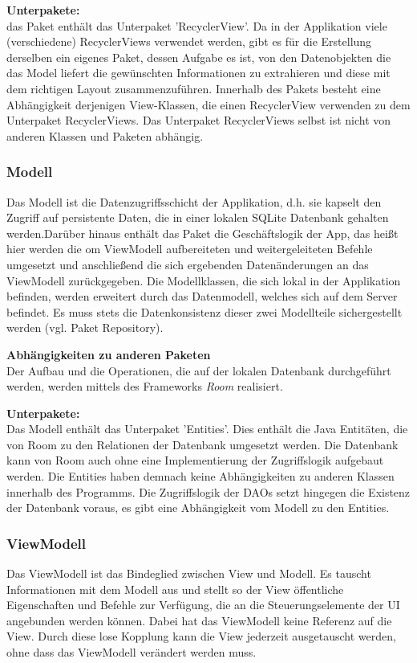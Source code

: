 \documentclass[11pt,a4paper]{article}
\begin{document}
\textbf{Unterpakete:}\\
das Paket enthält das Unterpaket 'RecyclerView'. Da in der Applikation viele (verschiedene) RecyclerViews verwendet werden, gibt es für die Erstellung derselben ein eigenes Paket, dessen Aufgabe es ist, von den Datenobjekten die das Model liefert die gewünschten Informationen zu extrahieren und diese mit dem richtigen Layout zusammenzuführen. Innerhalb des Pakets besteht eine Abhängigkeit derjenigen View-Klassen, die einen RecyclerView verwenden zu dem Unterpaket RecyclerViews. Das Unterpaket RecyclerViews selbst ist nicht von anderen Klassen und Paketen abhängig.

\subsubsection{Modell}
Das Modell ist die Datenzugriffsschicht der Applikation, d.h. sie kapselt den Zugriff auf persistente Daten, die in einer lokalen SQLite Datenbank gehalten werden.Darüber hinaus enthält das Paket die Geschäftslogik der App, das heißt hier werden die om ViewModell aufbereiteten und weitergeleiteten Befehle umgesetzt und anschließend die sich ergebenden Datenänderungen an das ViewModell zurückgegeben. Die Modellklassen, die sich lokal in der Applikation befinden, werden erweitert durch das Datenmodell, welches sich auf dem Server befindet. Es muss stets die Datenkonsistenz dieser zwei Modellteile sichergestellt werden (vgl. Paket Repository).

\textbf{Abhängigkeiten zu anderen Paketen}\\
Der Aufbau und die Operationen, die auf der lokalen Datenbank durchgeführt werden, werden mittels des Frameworks \textit{Room} realisiert.

\textbf{Unterpakete:}\\
Das Modell enthält das Unterpaket 'Entities'. Dies enthält die Java Entitäten, die von Room zu den Relationen der Datenbank umgesetzt werden. Die Datenbank kann von Room auch ohne eine Implementierung der Zugriffslogik aufgebaut werden. Die Entities haben demnach keine Abhängigkeiten zu anderen Klassen innerhalb des Programms. Die Zugriffslogik der DAOs setzt hingegen die Existenz der Datenbank voraus, es gibt eine Abhängigkeit vom Modell zu den Entities.

\subsubsection{ViewModell}
Das ViewModell ist das Bindeglied zwischen View und Modell. Es tauscht Informationen mit dem Modell aus und stellt so der View öffentliche Eigenschaften und Befehle zur Verfügung, die an die Steuerungselemente der UI angebunden werden können. Dabei hat das ViewModell keine Referenz auf die View. Durch diese lose Kopplung kann die View jederzeit ausgetauscht werden, ohne dass das ViewModell verändert werden muss.
\end{document}
